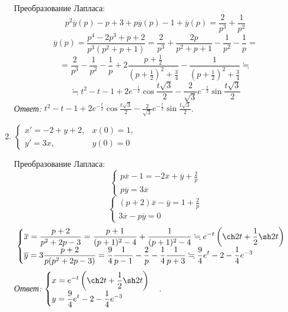 \documentclass[14pt, a4paper, titlepage, fleqn]{extarticle}
\begin{document}
\begin{enumerate}
            Преобразование Лапласа:
            \[
                p^2 \overline{y}(p) - p + 3 + p \overline{y}(p) - 1 + \overline{y}(p) = \frac{2}{p^3} + \frac{1}{p^2}
            \]
            \[
                \overline{y}(p) = \frac{p^4-2p^3+p+2}{p^3(p^2+p+1)} = \frac{2}{p^3} + \frac{2p}{p^2+p+1}-\frac{1}{p^2}-\frac{1}{p} =
            \]
            \[
                = \frac{2}{p^3} -\frac{1}{p^2}-\frac{1}{p} + 2\frac{p+\frac{1}{2}}{(p+\frac{1}{2})^2 + \frac{3}{4}} - \frac{1}{(p+\frac{1}{2})^2 + \frac{3}{4}} \fallingdotseq
            \]
            \[
                \fallingdotseq t^2 - t - 1 + 2e^{-\frac{t}{2}}\cos \frac{t \sqrt{3}}{2} - \frac{2}{\sqrt{3}} e^{-\frac{t}{2}}\sin \frac{t \sqrt{3}}{2}
            \]
            \textit{Ответ:} \( t^2 - t - 1 + 2e^{-\frac{t}{2}}\cos \frac{t \sqrt{3}}{2} - \frac{2}{\sqrt{3}} e^{-\frac{t}{2}}\sin \frac{t \sqrt{3}}{2} \).


            \item \( \begin{cases}
                x' = -2 + y + 2, & x(0)=1, \\
                y' = 3x, & y(0)=0
            \end{cases} \)

            Преобразование Лапласа:
            \[
                \begin{cases}
                    p \overline{x}-1 = -2 \overline{x} + \overline{y} + \frac{2}{p} \\
                    p \overline{y} = 3\overline{x}
                \end{cases}
            \]
            \[
                \begin{cases}
                    (p + 2)\overline{x} - \overline{y} = 1 + \frac{2}{p} \\
                    3\overline{x} - p \overline{y} = 0
                \end{cases}
            \]
            \[
                \begin{cases}
                    \displaystyle \overline{x} = \frac{p+2}{p^2+2p-3} = \frac{p+1}{(p+1)^2 - 4} + \frac{1}{(p+1)^2 - 4} \fallingdotseq e^{-t} \left(\ch 2t + \frac{1}{2} \sh 2t \right)   \\
                    \displaystyle \overline{y} = 3\frac{p+2}{p(p^2 + 2p - 3)} = \frac{9}{4}\frac{1}{p-1} - \frac{2}{p} - \frac{1}{4}\frac{1}{p+3} \fallingdotseq \frac{9}{4} e^t - 2 - \frac{1}{4} e^{-3}
                \end{cases}
            \]
            \textit{Ответ:} \( 
                \begin{cases}
                    \displaystyle x = e^{-t} \left(\ch 2t + \frac{1}{2} \sh 2t \right)   \\
                    \displaystyle y = \frac{9}{4} e^t - 2 - \frac{1}{4} e^{-3}
                \end{cases}
            \).


    \end{enumerate}
    
\end{document}
